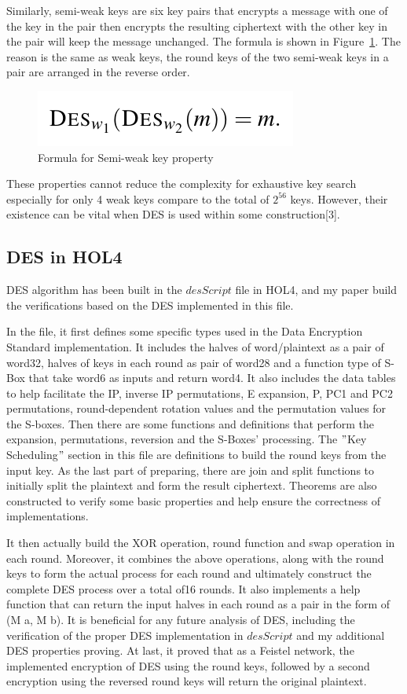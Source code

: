 \documentclass{article}
\begin{document}
Similarly, semi-weak keys are six key pairs that encrypts a message with one of the key in the pair then encrypts the resulting
ciphertext with the other key in the pair will keep the message unchanged. The formula is shown in Figure~\ref{fig:form3}. The reason
is the same as weak keys, the round keys of the two semi-weak keys in a pair are arranged in the reverse order.

\begin{figure}
\centering
\includegraphics[width=0.25\linewidth]{formula3}
\caption{\label{fig:form3} Formula for Semi-weak key property}
\end{figure}

These properties cannot reduce the complexity for exhaustive key search especially for only 4 weak keys compare to the total
of $2^{56}$ keys. However, their existence can be vital when DES is used within some construction[3].

\subsection{DES in HOL4}
DES algorithm has been built in the $desScript$ file in HOL4, and my paper build the verifications based on the DES implemented
in this file.

In the file, it first defines some specific types used in
the Data Encryption Standard implementation. It includes the halves of word/plaintext as a pair of word32, halves of
keys in each round as pair of word28 and a function type of S-Box that take word6 as inputs and return
word4. It also includes the data tables to help facilitate the IP, inverse IP permutations, E expansion, P, PC1 and PC2
permutations, round-dependent rotation values and the permutation values for the S-boxes. Then there are
some functions and definitions that perform the expansion, permutations, reversion and the S-Boxes' processing. The \("\)Key Scheduling\("\) section
in this file are definitions to build the round keys from the input key. As the last part of preparing, there are
join and split functions to initially split the plaintext and form the result ciphertext. Theorems are also constructed to
verify some basic properties and help ensure the correctness of implementations.

It then actually build the XOR operation, round function and swap operation in each round. Moreover, it combines the above operations, along with the
round keys to form the actual process for each round and ultimately construct the complete DES process over a total of16 rounds.
It also implements a help function that can return the input halves in each round as a pair in the form of (M a, M b). It is beneficial
for any future analysis of DES, including the verification of the proper DES implementation in $desScript$ and my additional DES
properties proving. At last, it proved that as a Feistel network, the implemented encryption of DES using the round
keys, followed by a second encryption using the reversed round keys will return the original plaintext.
\end{document}
